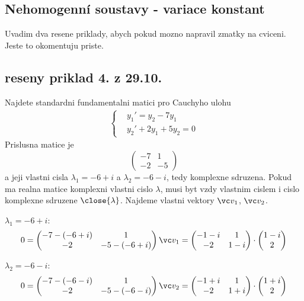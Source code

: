 \subsection{Nehomogenní soustavy - variace konstant}
%
Uvadim dva resene priklady, abych pokud mozno napravil zmatky na cviceni. Jeste to okomentuju priste.
\subsection{reseny priklad 4. z 29.10.}
Najdete standardni fundamentalni matici pro Cauchyho ulohu
 \begin{align*}
   \left\{
   \begin{aligned}
     &y_1'=y_2-7y_1\\
     &y_2'+2y_1+5y_2=0
   \end{aligned}\right.
\end{align*}
Prislusna matice je
\[
  \begin{pmatrix}-7&1\\-2&-5\end{pmatrix}
\]
a jeji vlastni cisla $\lambda_1=-6+i$ a $\lambda_2=-6-i$, tedy komplexne sdruzena. Pokud ma realna
matice komplexni vlastni cislo $\lambda$, musi byt vzdy vlastnim cislem i cislo komplexne
sdruzene $\close{\lambda}$. Najdeme vlastni vektory $\vc v_1$, $\vc v_2$.
\begin{description}
  \item $\lambda_1=-6+i$:
  \[
    0=\begin{pmatrix}-7-(-6+i)&1\\-2&-5-(-6+i)\end{pmatrix}\vc v_1
    =\begin{pmatrix}-1-i&1\\-2&1-i\end{pmatrix}\cdot 
     \begin{pmatrix}1-i\\2\end{pmatrix}
  \]
  \item $\lambda_2=-6-i$:
  \[
    0=\begin{pmatrix}-7-(-6-i)&1\\-2&-5-(-6-i)\end{pmatrix}\vc v_2
    =\begin{pmatrix}-1+i&1\\-2&1+i\end{pmatrix}\cdot 
     \begin{pmatrix}1+i\\2\end{pmatrix}
  \]
\end{description}
